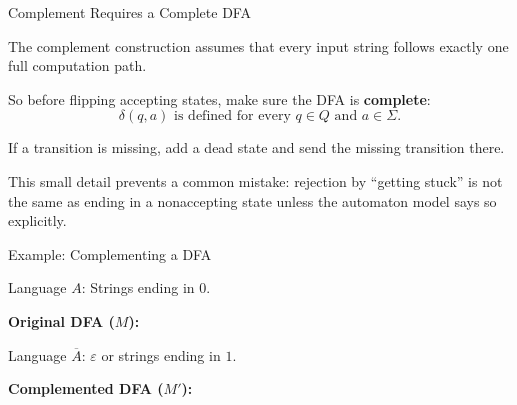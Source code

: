 \documentclass[10pt,aspectratio=169]{beamer}
\newcommand{\eps}{\varepsilon}
\begin{document}
\begin{frame}{Complement Requires a Complete DFA}

The complement construction assumes that every input string follows exactly one full computation path.

\vspace{0.8em}
So before flipping accepting states, make sure the DFA is \textbf{complete}:
\[
\delta(q,a) \text{ is defined for every } q\in Q \text{ and } a\in\Sigma.
\]

\vspace{0.8em}
If a transition is missing, add a dead state and send the missing transition there.

\vspace{0.8em}
This small detail prevents a common mistake: rejection by ``getting stuck'' is not the same as ending in a nonaccepting state unless the automaton model says so explicitly.

\end{frame}

\begin{frame}{Example: Complementing a DFA}
\small

Language $A$: Strings ending in $0$.

\textbf{Original DFA ($M$):}
\begin{center}
\end{center}

\vspace{0.5em}
Language $\overline{A}$: $\eps$ or strings ending in $1$.

\textbf{Complemented DFA ($M'$):}
\begin{center}
\end{center}

\end{frame}
\end{document}
